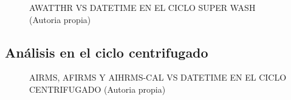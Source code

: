 \begin{figure}[H]
  \hfill
  \hfill
  \caption{AWATTHR VS DATETIME EN EL CICLO SUPER WASH (Autoria propia)}
  \end{figure}
\subsection{Análisis en el ciclo centrifugado}
\begin{figure}[H]
  \hfill
  \hfill
  \hfill
  \caption{AIRMS, AFIRMS Y AIHRMS-CAL VS DATETIME EN EL CICLO CENTRIFUGADO (Autoria propia)}
  \end{figure}
